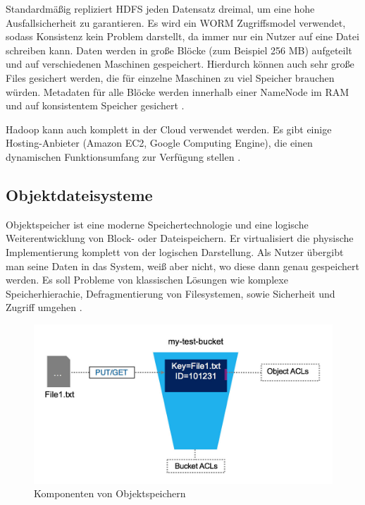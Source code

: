 Standardmäßig repliziert HDFS jeden Datensatz dreimal, um eine hohe Ausfallsicherheit zu garantieren. Es wird ein \ac{WORM} Zugriffsmodel verwendet, sodass Konsistenz kein Problem darstellt, da immer nur ein Nutzer auf eine Datei schreiben kann. Daten werden in große Blöcke (zum Beispiel 256 MB) aufgeteilt und auf verschiedenen Maschinen gespeichert. Hierdurch können auch sehr große Files gesichert werden, die für einzelne Maschinen zu viel Speicher brauchen würden. Metadaten für alle Blöcke werden innerhalb einer NameNode im RAM und auf konsistentem Speicher gesichert  \parencite[Kap. I,2]{alapati.2016}.

Hadoop kann auch komplett in der Cloud verwendet werden. Es gibt einige Hosting-Anbieter (Amazon EC2, Google Computing Engine), die einen dynamischen Funktionsumfang zur Verfügung stellen \parencite[Kap. I, 1]{alapati.2016}.

\subsection{Objektdateisysteme} \label{subsec:objectstorage}

Objektspeicher ist eine moderne Speichertechnologie und eine logische Weiterentwicklung von Block- oder Dateispeichern. Er virtualisiert die physische Implementierung komplett von der logischen Darstellung. Als Nutzer übergibt man seine Daten in das System, weiß aber nicht, wo diese dann genau gespeichert werden. Es soll Probleme von klassischen Lösungen wie komplexe Speicherhierachie, Defragmentierung von Filesystemen, sowie Sicherheit und Zugriff umgehen \parencite[Kap. 1, Object Storage]{varma.2015}.

\begin{figure}[hbt]
	\centering
	\includegraphics[scale=0.4]{images/object-storage}
	\caption{Komponenten von Objektspeichern \parencite[S. 5]{Rios.2017}}
	\label{fig:objectstorage}
\end{figure}

